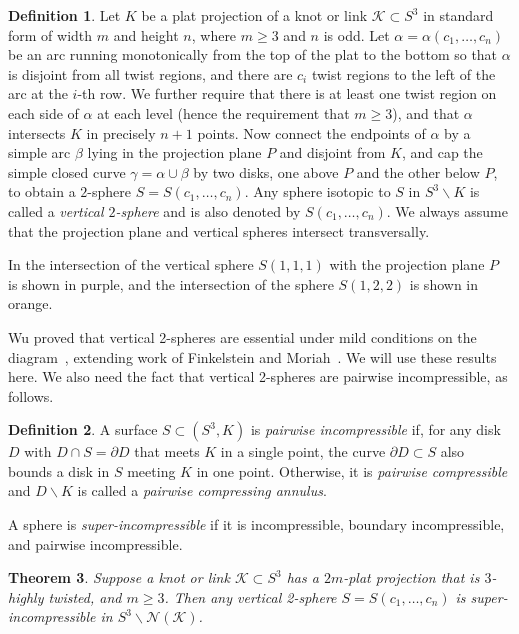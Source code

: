 \documentclass[12pt,reqno]{amsart}
\theoremstyle{plain}
\newtheorem{theorem}{Theorem}[section]
\theoremstyle{definition}
\newtheorem{definition}[theorem]{Definition}
\newcommand{\NN}{\mathcal{N}}
\newcommand{\bdy}{\partial}
\newcommand{\ssm}{\smallsetminus}
\begin{document}
\begin{definition}\label{def:vertical-two-sphere} 
Let $K$ be a plat projection of a knot or link $\mathcal{K}\subset S^3$ in 
standard form of width $m$ and height $n$, where $m\geq 3$ and $n$ is odd.  
Let
$\alpha=\alpha(c_1,\dots,c_{n})$ be an arc running monotonically
from the top of the plat to the bottom so that $\alpha$ is disjoint 
from all twist regions, and there are $c_i$ twist regions to the left 
of the arc at the $i$-th row. We further require that there is at least 
one twist region on each side of $\alpha$ at each level 
(hence the requirement that $m\geq 3$), and that $\alpha$
intersects $K$ in precisely $n+1$ points. Now connect the endpoints of 
$\alpha$ by a simple arc $\beta$ lying in the projection plane $P$ 
and disjoint from $K$, 
and cap the simple closed curve $\gamma=\alpha\cup\beta$ by two disks,
one above $P$ and the other below $P$, to obtain a $2$-sphere
$S=S(c_1,\dots,c_{n})$. Any sphere isotopic to $S$ in $S^3\ssm K$ is called a
\emph{vertical $2$-sphere} and is also denoted by $S(c_1,\dots,c_{n})$. 
We always assume that the projection
plane and vertical spheres intersect transversally.

\end{definition}

In  the intersection of the vertical sphere 
$S(1,1,1)$ with the projection plane $P$ is shown in purple, and the 
intersection of the sphere $S(1,2,2)$ is shown in orange.

Wu proved that vertical 2-spheres are essential under 
mild conditions on the diagram~\cite{Wu}, extending work of Finkelstein and
Moriah~\cite{FM1}. We will use these results here. We also need the 
fact that vertical 2-spheres are pairwise incompressible, as follows. 

\begin{definition}
A surface $S\subset (S^3,K)$ is \emph{pairwise incompressible} if, 
for any disk $D$ with $D\cap S=\bdy D$ that meets $K$ in a single 
point, the curve $\bdy D\subset S$ also bounds a disk in $S$ meeting 
$K$ in one point. Otherwise, it is \emph{pairwise compressible} and 
$D\ssm K$ is called a \emph{pairwise compressing annulus}. 

A sphere is \emph{super-incompressible} if it is incompressible, 
boundary incompressible, and pairwise incompressible.
\end{definition}

\begin{theorem}\label{Thm:super incompressible}
Suppose a knot or link $\mathcal{K}\subset S^3$ has a $2m$-plat  projection 
that is $3$-highly twisted, and $m\geq 3$. Then any vertical 2-sphere 
$S=S(c_1, \dots, c_n)$ is super-incompressible in $S^3\ssm \NN(\mathcal{K})$. 
\end{theorem}
\end{document}
